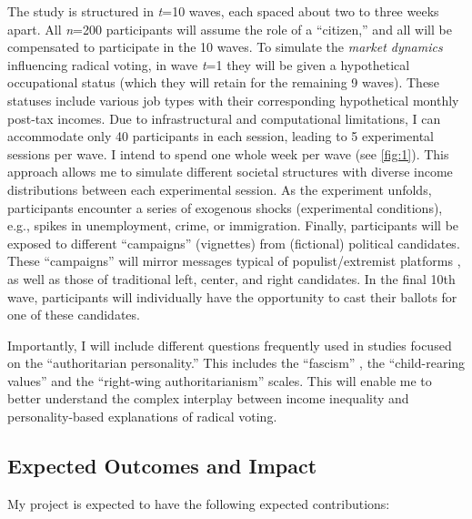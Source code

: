 \documentclass[letterpaper]{article}
\begin{document}
\vspace{2mm}The study is structured in \emph{t}=10 waves, each spaced about two to three weeks apart. All \emph{n}=200 participants will assume the role of a ``citizen,'' and all will be compensated to participate in the 10 waves. To simulate the \emph{market dynamics} influencing radical voting, in wave \emph{t}=1 they will be given a hypothetical occupational status (which they will retain for the remaining 9 waves). These statuses include various job types with their corresponding hypothetical monthly post-tax incomes. Due to infrastructural and computational limitations, I can accommodate only 40 participants in each session, leading to 5 experimental sessions per wave. I intend to spend one whole week per wave (see \autoref{fig:1}). This approach allows me to simulate different societal structures with diverse income distributions between each experimental session.  As the experiment unfolds, participants encounter a series of exogenous shocks (experimental conditions), e.g., spikes in unemployment, crime, or immigration. Finally, participants will be exposed to different ``campaigns'' (vignettes) from (fictional) political candidates. These ``campaigns'' will mirror messages typical of populist/extremist platforms \parencite{Schumacher2022}, as well as those of traditional left, center, and right candidates. In the final 10th wave, participants will individually have the opportunity to cast their ballots for one of these candidates. 

\vspace{2mm}Importantly, I will include different questions frequently used in studies focused on the ``authoritarian personality.'' This includes the ``fascism'' \parencite{Altemeyer1981}, the ``child-rearing values'' \parencite{Helminen2023} and the ``right-wing authoritarianism'' \parencite{Duckitt2013a,Feldman2003,Hetherington2009} scales. This will enable me to better understand the complex interplay between income inequality and personality-based explanations of radical voting. 

\subsection*{Expected Outcomes and Impact}

My project is expected to have the following expected contributions:
\end{document}
